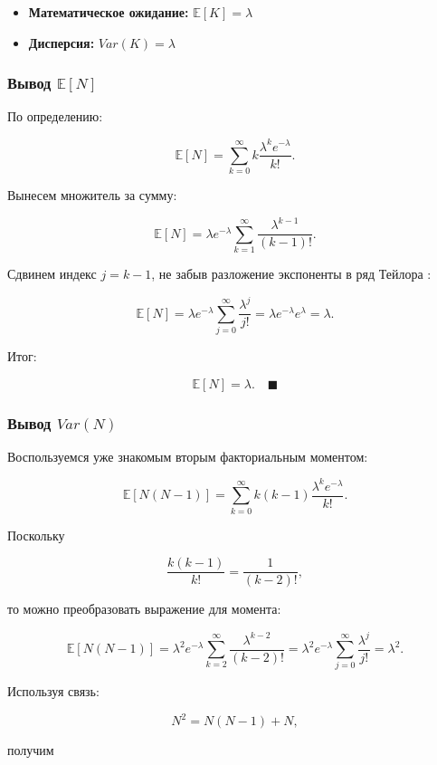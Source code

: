 \documentclass[
  russian,
  letterpaper,
]{scrbook}
\begin{document}
\begin{itemize}
\item
  \textbf{Математическое ожидание:} \(\mathbb{E}[K]=\lambda\)
\item
  \textbf{Дисперсия:} \(Var(K)=\lambda\)
\end{itemize}

\subsubsection{\texorpdfstring{\textbf{Вывод}
\(\mathbb{E}[N]\)}{Вывод \textbackslash mathbb\{E\}{[}N{]}}}\label{ux432ux44bux432ux43eux434-mathbben}

По определению:

\[\mathbb{E}[N]=\sum_{k=0}^\infty k\frac{\lambda^k e^{-\lambda}}{k!}.\]

Вынесем множитель за сумму:

\[\mathbb{E}[N]=\lambda e^{-\lambda}\sum_{k=1}^\infty \frac{\lambda^{k-1} }{(k-1)!}.\]

Сдвинем индекс \(j=k-1\), не забыв разложение экспоненты в ряд Тейлора :

\[\mathbb{E}[N]=\lambda e^{-\lambda}\sum_{j=0}^\infty \frac{\lambda^{j} }{j!}=\lambda e^{-\lambda}e^{\lambda}=\lambda.\]

Итог:

\[\mathbb{E}[N]=\lambda. \quad \blacksquare\]

\subsubsection{\texorpdfstring{\textbf{Вывод}
\(Var(N)\)}{Вывод Var(N)}}\label{ux432ux44bux432ux43eux434-varn}

Воспользуемся уже знакомым вторым факториальным моментом:

\[\mathbb{E}[N(N-1)]=\sum_{k=0}^\infty k(k-1)\frac{\lambda^k e^{-\lambda}}{k!}.\]

Поскольку

\[\frac{k(k-1)}{k!}=\frac{1}{(k-2)!},\]

то можно преобразовать выражение для момента:

\[\mathbb{E}[N(N-1)]=\lambda^2 e^{-\lambda}\sum_{k=2}^\infty \frac{\lambda^{k-2} }{(k-2)!}=\lambda^2 e^{-\lambda}\sum_{j=0}^\infty \frac{\lambda^{j} }{j!}=\lambda^2.\]

Используя связь:

\[N^2=N(N-1)+N,\]

получим
\end{document}
